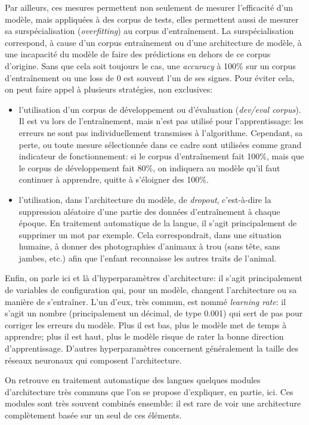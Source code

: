 Par ailleurs, ces mesures permettent non seulement de mesurer l'efficacité d'un modèle, mais appliquées à des corpus de tests, elles permettent aussi de mesurer sa surspécialisation\label{deep-learning:overfitting} (\textit{overfitting}) au corpus d'entraînement. La surspécialisation correspond, à cause d'un corpus entraînement ou d'une architecture de modèle, à une incapacité du modèle de faire des prédictions en dehors de ce corpus d'origine. Sans que cela soit toujours le cas, une \textit{accuracy} à 100\% sur un corpus d'entraînement ou une loss de 0 est souvent l'un de ses signes. Pour éviter cela, on peut faire appel à plusieurs stratégies, non exclusives:
\begin{itemize}
    \item l'utilisation d'un corpus de développement ou d'évaluation (\textit{dev/eval corpus}). Il est vu lors de l'entraînement, mais n'est pas utilisé pour l'apprentissage: les erreurs ne sont pas individuellement transmises à l'algorithme. Cependant, sa perte, ou toute mesure sélectionnée dans ce cadre sont utilisées comme grand indicateur de fonctionnement: si le corpus d'entraînement fait 100\%, mais que le corpus de développement fait 80\%, on indiquera au modèle qu'il faut continuer à apprendre, quitte à s'éloigner des 100\%.
    \item l'utilisation, dans l'architecture du modèle, de \textit{dropout}, c'est-à-dire la suppression aléatoire d'une partie des données d'entraînement à chaque époque. En traitement automatique de la langue, il s'agit principalement de supprimer un mot par exemple. Cela correspondrait, dans une situation humaine, à donner des photographies d'animaux à trou (sans tête, sans jambes, etc.) afin que l'enfant reconnaisse les autres traits de l'animal. %
\end{itemize}

Enfin, on parle ici et là d'hyperparamètres d'architecture: il s'agit principalement de variables de configuration qui, pour un modèle, changent l'architecture ou sa manière de s'entraîner. L'un d'eux, très commun, est nommé \textit{learning rate}: il s'agit un nombre (principalement un décimal, de type 0.001) qui sert de pas pour corriger les erreurs du modèle. Plus il est bas, plus le modèle met de temps à apprendre; plus il est haut, plus le modèle risque de rater la bonne direction d'apprentissage. D'autres hyperparamètres concernent généralement la taille des réseaux neuronaux qui composent l'architecture. 

On retrouve en traitement automatique des langues quelques modules d'architecture très communs que l'on se propose d'expliquer, en partie, ici. Ces modules sont très souvent combinés ensemble: il est rare de voir une architecture complètement basée sur un seul de ces éléments.


